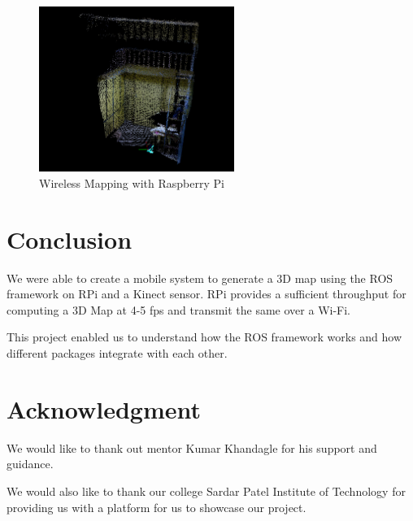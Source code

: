 \documentclass[journal]{IEEEtran}
\begin{document}
\begin{figure}[ht]
	\centering
	\includegraphics[width=2.5in]{2(2).png}
	\caption{Wireless Mapping with Raspberry Pi}
	\label{fig_sim}
\end{figure}

\section{Conclusion}
We were able to create a mobile system to generate a 3D map using the ROS framework on RPi and a Kinect sensor.
RPi provides a sufficient throughput for computing a 3D Map at 4-5 fps and transmit the same over a Wi-Fi.

This project enabled us to understand how the ROS framework works and how different packages integrate with each other.

\section*{Acknowledgment}

We would like to thank out mentor Kumar Khandagle for his support and guidance.

We would also like to thank our college Sardar Patel Institute of Technology for providing us with a platform for us to showcase our project.


\ifCLASSOPTIONcaptionsoff
  \newpage
\fi




\end{document}
